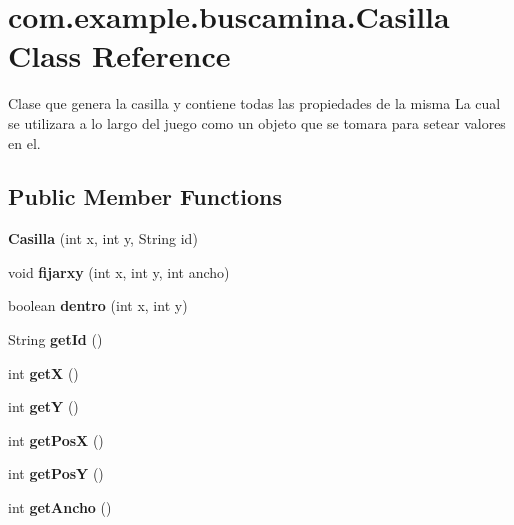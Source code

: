 \section{com.\-example.\-buscamina.\-Casilla Class Reference}
\label{classcom_1_1example_1_1buscamina_1_1_casilla}


Clase que genera la casilla y contiene todas las propiedades de la misma La cual se utilizara a lo largo del juego como un objeto que se tomara para setear valores en el.  


\subsection*{Public Member Functions}
\begin{DoxyCompactItemize}
\item 
{\bfseries Casilla} (int x, int y, String id)\label{classcom_1_1example_1_1buscamina_1_1_casilla_a497ed82590b394496f386ddc77cc9233}

\item 
void {\bfseries fijarxy} (int x, int y, int ancho)\label{classcom_1_1example_1_1buscamina_1_1_casilla_ad8143e0c5c2bd302f5518b3b4a3eb8b1}

\item 
boolean {\bfseries dentro} (int x, int y)\label{classcom_1_1example_1_1buscamina_1_1_casilla_ab0127373826c1eb57adf69548991125e}

\item 
String {\bfseries get\-Id} ()\label{classcom_1_1example_1_1buscamina_1_1_casilla_a7847887a7ee320d31ab1314c7f7ce82e}

\item 
int {\bfseries get\-X} ()\label{classcom_1_1example_1_1buscamina_1_1_casilla_a82a39f22da4c18d74c0d8be300d6c7d6}

\item 
int {\bfseries get\-Y} ()\label{classcom_1_1example_1_1buscamina_1_1_casilla_a281f632d586c23f7900928fc24770b34}

\item 
int {\bfseries get\-Pos\-X} ()\label{classcom_1_1example_1_1buscamina_1_1_casilla_af987e5173513703dcf4b5b42fff4dad3}

\item 
int {\bfseries get\-Pos\-Y} ()\label{classcom_1_1example_1_1buscamina_1_1_casilla_a88765bbccb20950aae2f8deab1c981f0}

\item 
int {\bfseries get\-Ancho} ()\label{classcom_1_1example_1_1buscamina_1_1_casilla_aa3a8aff2ff43d36ca57e5fc07f4e7c66}


\end{DoxyCompactItemize}
